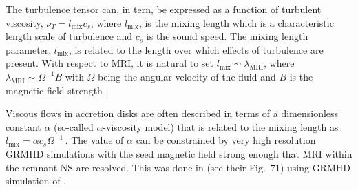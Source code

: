 The turbulence tensor can, in tern, be expressed as a function of 
turbulent viscosity, $\nu_T = l_{\text{mix}}c_s$, where $l_{\text{mix}}$,
is the mixing length which is a characteristic length scale of turbulence and 
$c_s$ is the sound speed.
%
%
%
%
%
The mixing length parameter, $l_{\text{mix}}$, is related to the length 
over which effects of turbulence are present. 
%
%
%
%
%
%
With respect to \ac{MRI}, it is natural to set 
$l_{\text{mix}} \sim \lambda_{\text{MRI}}$, where 
$\lambda_{\text{MRI}} \sim \Omega^{-1}B$ with $\Omega$ 
being the angular velocity of the fluid and $B$ is the magnetic
field strength \citep{Duez:2006qe}.

Viscous flows in accretion disks are often described in terms of a dimensionless 
constant $\alpha$ (so-called $\alpha$-viscosity model) that is related to the 
mixing length as \citep{Shakura:1972te} 
%
$ l_{\text{mix}} = \alpha c_s \Omega^{-1}\, . $ 
%
%
The value of $\alpha$ can be constrained by very high resolution 
\ac{GRMHD} simulations with the seed magnetic field 
strong enough that \ac{MRI} within the remnant \ac{NS} are resolved. 
This was done in \citet{Radice:2020ids} (see their Fig.~71) 
using \ac{GRMHD} simulation of \citet{Kiuchi:2017zzg}.



